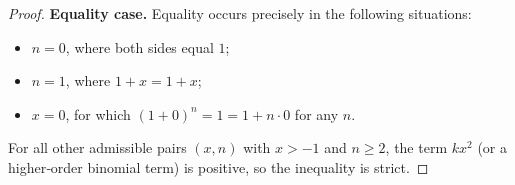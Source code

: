 \begin{proof}
\medskip
\noindent\textbf{Equality case.}  
Equality occurs precisely in the following situations:
\begin{itemize}
\item $n=0$, where both sides equal $1$;
\item $n=1$, where $1+x=1+x$;
\item $x=0$, for which $(1+0)^{n}=1=1+n\cdot0$ for any $n$.
\end{itemize}
For all other admissible pairs $(x,n)$ with $x>-1$ and $n\ge 2$, the term $kx^{2}$ (or a higher‑order binomial term) is positive, so the inequality is strict.
\end{proof}